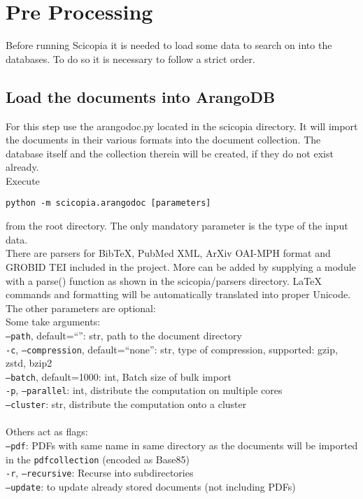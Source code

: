 \section{Pre Processing}\label{prepros}
Before running Scicopia it is needed to load some data to search on into the databases. To do so it is necessary to follow a strict order.

\subsection{Load the documents into ArangoDB}
For this step use the arangodoc.py located in the scicopia directory. It will import the documents in their various formats into the document collection. The database itself and the collection therein will be created, if they do not exist already.\\
Execute 
\begin{verbatim}
python -m scicopia.arangodoc [parameters]
\end{verbatim}
from the root directory.
The only mandatory parameter is the type of the input data.\\
There are parsers for BibTeX, PubMed XML, ArXiv OAI-MPH format and GROBID TEI included in the project. More can be added by supplying a module with a parse() function as shown in the scicopia/parsers directory. LaTeX commands and formatting will be automatically translated into proper Unicode.\\
The other parameters are optional:\\
Some take arguments:\\
\texttt{--path}, default=``'': str, path to the document directory\\
\texttt{-c}, \texttt{--compression}, default=``none'': str, type of compression, supported: gzip, zstd, bzip2\\
\texttt{--batch}, default=1000: int, Batch size of bulk import\\
\texttt{-p}, \texttt{--parallel}: int, distribute the computation on multiple cores\\
\texttt{--cluster}: str, distribute the computation onto a cluster\\
\\
Others act as flags:\\
\texttt{--pdf}: PDFs with same name in same directory as the documents will be imported in the \texttt{pdfcollection} (encoded as Base85)\\
\texttt{-r}, \texttt{--recursive}: Recurse into subdirectories\\
\texttt{--update}: to update already stored documents (not including PDFs)\\

